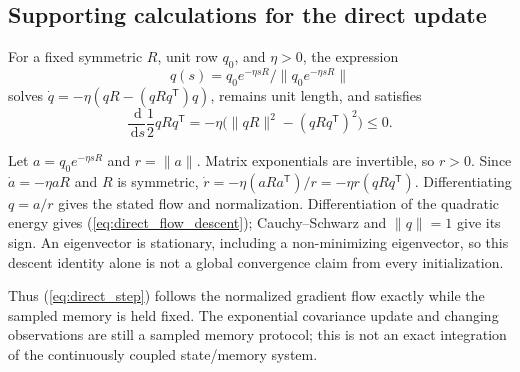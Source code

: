 \documentclass[journal]{IEEEtran}
\newcommand{\dd}{\,\mathrm d}
\begin{document}
\subsection{Supporting calculations for the direct update}
\begin{directproposition}
\label{prop:direct_exact_flow}
For a fixed symmetric $R$, unit row $q_0$, and $\eta>0$, the expression
\begin{equation}
 q(s)=q_0e^{-\eta sR}/\|q_0e^{-\eta sR}\|
 \label{eq:direct_flow_solution}
\end{equation}
solves $\dot q=-\eta(qR-(qRq^{\mathsf T})q)$, remains unit length, and
satisfies
\begin{equation}
 \frac{\dd}{\dd s}\frac12qRq^{\mathsf T}
 =-\eta\bigl(\|qR\|^2-(qRq^{\mathsf T})^2\bigr)\le0.
 \label{eq:direct_flow_descent}
\end{equation}
\end{directproposition}
\begin{IEEEproof}
Let $a=q_0e^{-\eta sR}$ and $r=\|a\|$. Matrix exponentials are
invertible, so $r>0$. Since $\dot a=-\eta aR$ and $R$ is symmetric,
$\dot r=-\eta(aRa^{\mathsf T})/r=-\eta r(qRq^{\mathsf T})$.
Differentiating $q=a/r$ gives the stated flow and normalization.
Differentiation of the quadratic energy gives
(\ref{eq:direct_flow_descent}); Cauchy--Schwarz and $\|q\|=1$ give its
sign. An eigenvector is stationary, including a non-minimizing
eigenvector, so this descent identity alone is not a global convergence
claim from every initialization.
\end{IEEEproof}
Thus (\ref{eq:direct_step}) follows the normalized gradient flow exactly
while the sampled memory is held fixed. The exponential covariance update
and changing observations are still a sampled memory protocol; this is
not an exact integration of the continuously coupled state/memory system.
\end{document}
